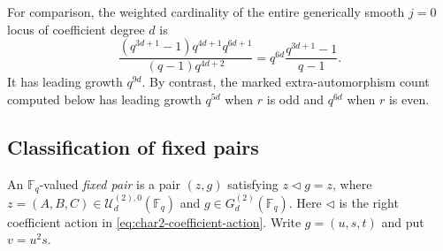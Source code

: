 \documentclass[a4paper,12pt]{amsart}
\theoremstyle{definition}
\newcommand{\cU}{\mathcal{U}}
\newcommand{\Fb}{\mathbb{F}}
\begin{document}
For comparison, the weighted cardinality of the entire generically smooth $j=0$ locus of coefficient degree $d$ is
\begin{equation}\label{eq:char2-full-jzero}
\frac{(q^{3d+1}-1)q^{4d+1}q^{6d+1}}
{(q-1)q^{4d+2}}
=
q^{6d}\frac{q^{3d+1}-1}{q-1}.
\end{equation}
It has leading growth $q^{9d}$.  By contrast, the marked extra-automorphism count computed below has leading growth $q^{5d}$ when $r$ is odd and $q^{6d}$ when $r$ is even.

\subsection{Classification of fixed pairs}

An $\Fb_q$-valued \emph{fixed pair} is a pair $(z,g)$ satisfying $z\mathbin{\triangleleft}g=z$, where $z=(A,B,C)\in\cU_d^{(2),0}(\Fb_q)$ and $g\in G_d^{(2)}(\Fb_q)$.  Here $\triangleleft$ is the right coefficient action in \eqref{eq:char2-coefficient-action}.  Write $g=(u,s,t)$ and put $v=u^2s$.
\end{document}
